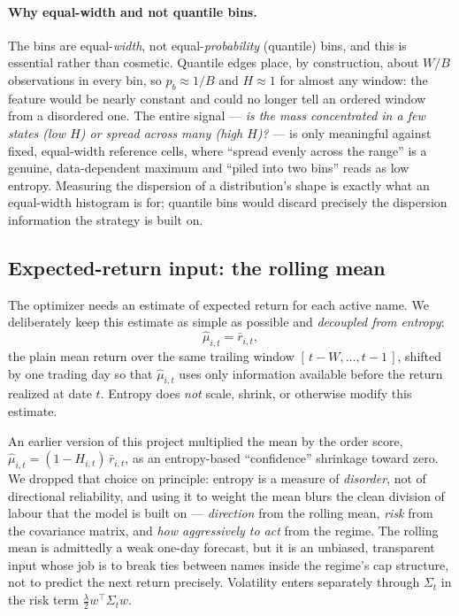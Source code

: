 \documentclass[a4paper,12pt]{article}
\begin{document}
\paragraph{Why equal-width and not quantile bins.} The bins are equal-\emph{width}, not equal-\emph{probability} (quantile) bins, and this is essential rather than cosmetic. Quantile edges place, by construction, about $W/B$ observations in every bin, so $p_b\approx 1/B$ and $H\approx 1$ for almost any window: the feature would be nearly constant and could no longer tell an ordered window from a disordered one. The entire signal --- \emph{is the mass concentrated in a few states (low $H$) or spread across many (high $H$)?} --- is only meaningful against fixed, equal-width reference cells, where ``spread evenly across the range'' is a genuine, data-dependent maximum and ``piled into two bins'' reads as low entropy. Measuring the dispersion of a distribution's shape is exactly what an equal-width histogram is for; quantile bins would discard precisely the dispersion information the strategy is built on.

\subsection{Expected-return input: the rolling mean}
\label{sec:mu}

The optimizer needs an estimate of expected return for each active name. We deliberately keep this estimate as simple as possible and \emph{decoupled from entropy}:
\[
\widehat{\mu}_{i,t}=\bar r_{i,t},
\]
the plain mean return over the same trailing window $[\,t-W,\ldots,t-1\,]$, shifted by one trading day so that $\widehat\mu_{i,t}$ uses only information available before the return realized at date $t$. Entropy does \emph{not} scale, shrink, or otherwise modify this estimate.

An earlier version of this project multiplied the mean by the order score, $\widehat\mu_{i,t}=(1-H_{i,t})\,\bar r_{i,t}$, as an entropy-based ``confidence'' shrinkage toward zero. We dropped that choice on principle: entropy is a measure of \emph{disorder}, not of directional reliability, and using it to weight the mean blurs the clean division of labour that the model is built on --- \emph{direction} from the rolling mean, \emph{risk} from the covariance matrix, and \emph{how aggressively to act} from the regime. The rolling mean is admittedly a weak one-day forecast, but it is an unbiased, transparent input whose job is to break ties between names inside the regime's cap structure, not to predict the next return precisely. Volatility enters separately through $\Sigma_t$ in the risk term $\tfrac{\lambda}{2}w^\top\Sigma_t w$.
\end{document}
